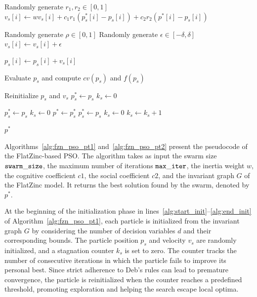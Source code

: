 \begin{algorithm}
	\caption{FlatZinc-Based Particle Swarm Optimization search phase}
	\label{alg:fzn_pso_pt2}
	\begin{algorithmic}[1]
		
		\State Randomly generate $r_1,r_2\in[0,1]$
		\label{alg:start_update}
		\State $v_s[i]\gets wv_s[i]+c_1r_1(p_s^*[i]-p_s[i])+c_2r_2(p^*[i]-p_s[i])$
		\label{alg:end_update}
		
		
		\State Randomly generate $\rho\in[0,1]$
		\label{alg:start_noise}
		\State Randomly generate $\epsilon\in[-\delta,\delta]$
		\State $v_s[i]\gets v_s[i]+\epsilon$
		\EndIf
		\label{alg:end_noise}
		
		\State $p_s[i]\gets p_s[i]+v_s[i]$
		\label{alg:start_second_eval}
		\EndFor
		
		\State Evaluate $p_s$ and compute $cv(p_s)$ and $f(p_s)$
		\label{alg:end_second_eval}
		
		\label{alg:start_stagnation}
		\State Reinitialize $p_s$ and $v_s$
		\State $p_s^*\gets p_s$
		\State $k_s\gets0$
		\EndIf
		\label{alg:end_stagnation}
		
		\label{alg:start_deb}
		\State $p_s^*\gets p_s$
		\State $k_s\gets0$
		\State $p^*\gets p_s^*$
		\EndIf
		\EndIf
		\State $p_s^*\gets p_s$
		\State $k_s\gets0$
		\Else
		\State $k_s\gets k_s+1$
		\EndIf
		\label{alg:end_deb}
		
		\EndFor
		
		\EndFor
		
		\State \Return $p^*$
		
	\end{algorithmic}
\end{algorithm}

Algorithms~\ref{alg:fzn_pso_pt1} and~\ref{alg:fzn_pso_pt2} present the pseudocode of the FlatZinc-based PSO. The algorithm takes as input the swarm size $\mathtt{swarm\_size}$, the maximum number of iterations $\mathtt{max\_iter}$, the inertia weight $w$, the cognitive coefficient $c1$, the social coefficient $c2$, and the invariant graph $G$ of the FlatZinc model. It returns the best solution found by the swarm, denoted by $p^*$.

At the beginning of the initialization phase in lines~\ref{alg:start_init}--\ref{alg:end_init} of Algorithm~\ref{alg:fzn_pso_pt1}, each particle is initialized from the invariant graph $G$ by considering the number of decision variables $d$ and their corresponding bounds. The particle position $p_s$ and velocity $v_s$ are randomly initialized, and a stagnation counter $k_s$ is set to zero. The counter tracks the number of consecutive iterations in which the particle fails to improve its personal best. Since strict adherence to Deb's rules can lead to premature convergence, the particle is reinitialized when the counter reaches a predefined threshold, promoting exploration and helping the search escape local optima.

